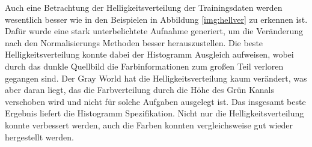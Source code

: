 \documentclass[a4paper,12pt,oneside]{article}
\begin{document}
Auch eine Betrachtung der Helligkeitsverteilung der Trainingsdaten werden wesentlich besser wie in den Beispielen in Abbildung \ref{img:hellver} zu erkennen ist. Dafür wurde eine stark unterbelichtete Aufnahme generiert, um die Veränderung nach den Normalisierungs Methoden besser herauszustellen. Die beste Helligkeitsverteilung konnte dabei der Histogramm Ausgleich aufweisen, wobei durch das dunkle Quellbild die Farbinformationen zum großen Teil verloren gegangen sind. Der Gray World hat die Helligkeitsverteilung kaum verändert, was aber daran liegt, das die Farbverteilung durch die Höhe des Grün Kanals verschoben wird und nicht für solche Aufgaben ausgelegt ist. Das insgesamt beste Ergebnis liefert die Histogramm Spezifikation. Nicht nur die Helligkeitsverteilung konnte verbessert werden, auch die Farben konnten vergleichsweise gut wieder hergestellt werden.
  \newpage
\end{document}
